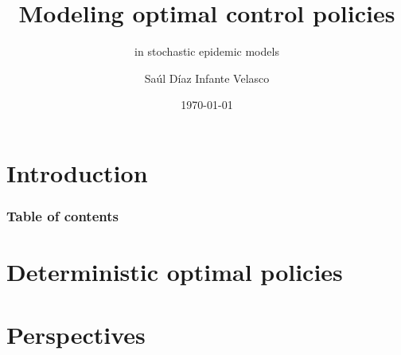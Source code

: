 \documentclass[9pt]{beamer}
\title{Modeling optimal control policies}
\subtitle{in stochastic epidemic models}
\author{Saúl Díaz Infante Velasco}
\institute{CONACYT-UNIVERSIDAD de SONORA}
\date{\today}
\begin{document}
    \titlepage
    \section{Introduction}
        
    \begin{frame}
        \frametitle{Table of contents}
        \tableofcontents
    \end{frame}
    \section{Deterministic optimal policies}
        
        
    \section{Perspectives}
        
\end{document}
